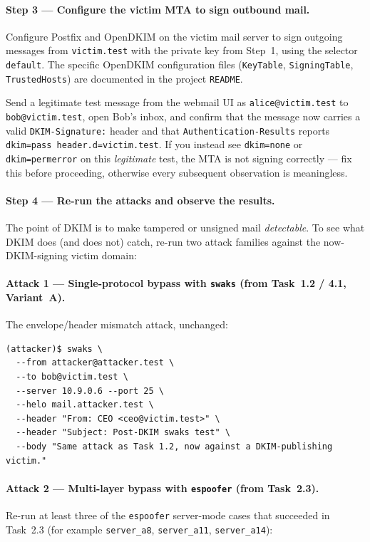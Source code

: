 \documentclass[11pt]{article}
\begin{document}
\paragraph{Step 3 --- Configure the victim MTA to sign outbound mail.}
Configure Postfix and OpenDKIM on the victim mail server to sign
outgoing messages from \texttt{victim.test} with the private key from
Step~1, using the selector \texttt{default}. The specific OpenDKIM
configuration files (\texttt{KeyTable}, \texttt{SigningTable},
\texttt{TrustedHosts}) are documented in the project
\texttt{README}.

Send a legitimate test message from the webmail UI as
\texttt{alice@victim.test} to \texttt{bob@victim.test}, open Bob's
inbox, and confirm that the message now carries a valid
\texttt{DKIM-Signature:} header and that
\texttt{Authentication-Results} reports \texttt{dkim=pass header.d=victim.test}.
If you instead see \texttt{dkim=none} or \texttt{dkim=permerror} on
this \emph{legitimate} test, the MTA is not signing correctly --- fix
this before proceeding, otherwise every subsequent observation is
meaningless.

\paragraph{Step 4 --- Re-run the attacks and observe the results.}
The point of DKIM is to make tampered or unsigned mail
\emph{detectable}. To see what DKIM does (and does not) catch, re-run
two attack families against the now-DKIM-signing victim domain:

\paragraph{Attack 1 --- Single-protocol bypass with \texttt{swaks}
(from Task~1.2 / 4.1, Variant~A).}
The envelope/header mismatch attack, unchanged:

\begin{listing}[H]
\begin{verbatim}
(attacker)$ swaks \
  --from attacker@attacker.test \
  --to bob@victim.test \
  --server 10.9.0.6 --port 25 \
  --helo mail.attacker.test \
  --header "From: CEO <ceo@victim.test>" \
  --header "Subject: Post-DKIM swaks test" \
  --body "Same attack as Task 1.2, now against a DKIM-publishing victim."
\end{verbatim}
\end{listing}

\paragraph{Attack 2 --- Multi-layer bypass with \texttt{espoofer}
(from Task~2.3).}
Re-run at least three of the \texttt{espoofer} server-mode cases that
succeeded in Task~2.3 (for example \texttt{server\_a8},
\texttt{server\_a11}, \texttt{server\_a14}):
\end{document}
